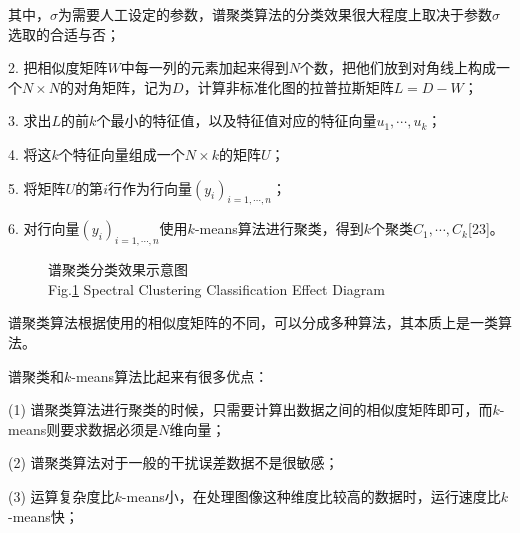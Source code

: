 其中，$\sigma$为需要人工设定的参数，谱聚类算法的分类效果很大程度上取决于参数$\sigma$选取的合适与否；

2. 把相似度矩阵$W$中每一列的元素加起来得到$N$个数，把他们放到对角线上构成一个$N\times N$的对角矩阵，记为$D$，计算非标准化图的拉普拉斯矩阵$L=D-W$；

3. 求出$L$的前$k$个最小的特征值，以及特征值对应的特征向量$u_1,\cdots,u_k$；

4. 将这$k$个特征向量组成一个$N\times k$的矩阵$U$；

5. 将矩阵$U$的第$i$行作为行向量$(y_i)_{i=1,\cdots,n}$；

6. 对行向量$(y_i)_{i=1,\cdots,n}$使用$k$-means算法进行聚类，得到$k$个聚类$C_1,\cdots,C_k$[23]。

\begin{figure}[H]
    \centering
    \captionsetup{justification=centering}
    \caption{谱聚类分类效果示意图 \\ Fig.\ref{谱聚类分类效果示意图} Spectral Clustering Classification Effect Diagram}
    \label{谱聚类分类效果示意图}
\end{figure}


谱聚类算法根据使用的相似度矩阵的不同，可以分成多种算法，其本质上是一类算法。

谱聚类和$k$-means算法比起来有很多优点：

(1) 谱聚类算法进行聚类的时候，只需要计算出数据之间的相似度矩阵即可，而$k$-means则要求数据必须是$N$维向量；

(2) 谱聚类算法对于一般的干扰误差数据不是很敏感；

(3) 运算复杂度比$k$-means小，在处理图像这种维度比较高的数据时，运行速度比$k$-means快；

